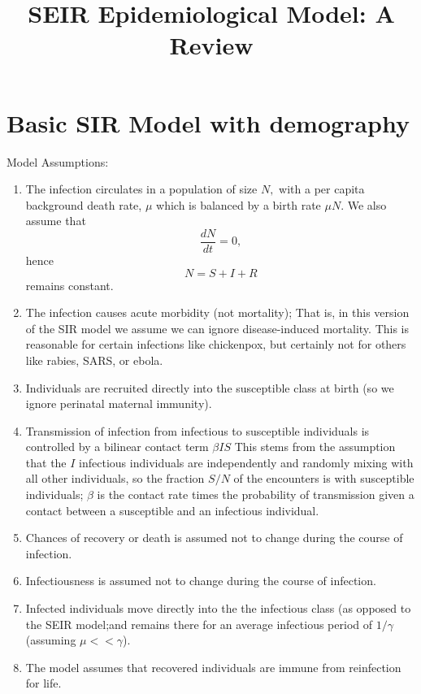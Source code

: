 \documentclass[12pt]{article}\usepackage[]{graphicx}\usepackage[]{color}
\title{SEIR Epidemiological Model: A Review}
\author{}
\date{
}
\begin{document}
\maketitle

\section{Basic SIR Model with demography}

Model Assumptions:

\begin{enumerate}
\item The infection circulates in a population of size $N,$ with a per capita background death rate, $\mu$ which is balanced by a birth rate $\mu N.$ We also assume that $$\frac{dN}{dt} = 0,$$ hence  $$N = S + I + R$$ remains constant.
\item The infection causes acute morbidity (not mortality); That is, in this version of the SIR model we assume we can ignore disease-induced mortality. This is reasonable for certain infections like chickenpox, but certainly not for others like rabies, SARS, or ebola.
\item Individuals are recruited directly into the susceptible class at birth (so we ignore perinatal maternal immunity).
\item Transmission of infection from infectious to susceptible individuals is controlled by a bilinear contact term $\beta I S$ This stems from the assumption that the $I$ infectious individuals are independently and randomly mixing with all other individuals, so the fraction $S/N$ of the encounters is with susceptible individuals; $\beta$ is the contact rate times the probability of transmission given a contact between a susceptible and an infectious individual.
\item Chances of recovery or death is assumed not to change during the course of infection.
\item Infectiousness is assumed not to change during the course of infection.
\item Infected individuals move directly into the the infectious class (as opposed to the SEIR model;and remains there for an average infectious period of $1/\gamma$ (assuming $\mu << \gamma$).
\item The model assumes that recovered individuals are immune from reinfection for
life.
\end{enumerate}
\end{document}
